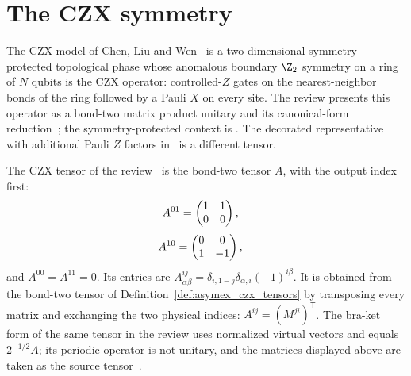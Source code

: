 \section{The CZX symmetry}%
\label{sec:asymex_czx}

The CZX model of Chen, Liu and Wen~\cite{ChenLiuWen2011CZX} is a
two-dimensional symmetry-protected topological phase whose anomalous
boundary $\Z_2$ symmetry on a ring of $N$ qubits is the CZX operator:
controlled-$Z$ gates on the nearest-neighbor bonds of the ring followed by
a Pauli $X$ on every site. The review presents this operator as a bond-two
matrix product unitary and its canonical-form
reduction~\cite[Appendix~A, ``The CZX MPU'']{Cirac2021Matrix}; the
symmetry-protected context is \cite[Section~III.B.1]{Cirac2021Matrix}. The
decorated representative with additional Pauli $Z$ factors
in~\cite[Section~III.D]{GarreRubioSchuch2024DomainWall} is a different
tensor.

\begin{definition}
    \label{def:asymex_czx_review_tensor}
    \leanok
    The CZX tensor of the review~\cite[Appendix~A, ``The CZX MPU'']{Cirac2021Matrix}
    is the bond-two tensor $A$, with the output index first:
    \begin{align}
        A^{01} & =\begin{pmatrix}1&1\\0&0\end{pmatrix},
        \notag
    \end{align}
    \begin{align}
        A^{10} & =\begin{pmatrix}0&0\\1&-1\end{pmatrix},
        \notag
    \end{align}
    and $A^{00}=A^{11}=0$. Its entries are
    $A^{ij}_{\alpha\beta}=\delta_{i,1-j}\delta_{\alpha,i}(-1)^{i\beta}$.
    It is obtained from the bond-two tensor of
    Definition~\ref{def:asymex_czx_tensors} by transposing every matrix
    and exchanging the two physical indices: $A^{ij}=(M^{ji})^{\mathsf T}$.
    The bra-ket form of the same tensor in the review uses normalized
    virtual vectors and equals $2^{-1/2}A$; its periodic operator is not
    unitary, and the matrices displayed above are taken as the source
    tensor~\cite{gap:mpu_czx_tensor_normalization}.
\end{definition}

